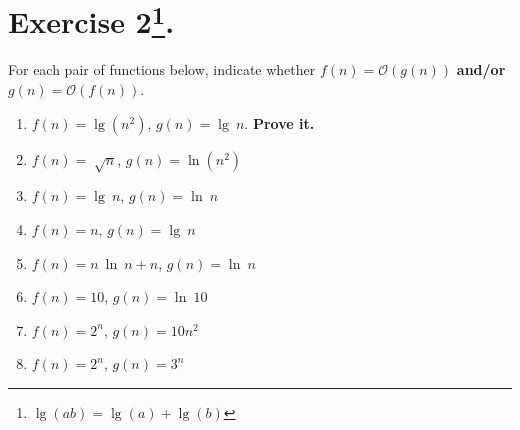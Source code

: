 \documentclass{article}
\begin{document}
\section*{Exercise 2\footnote{$\lg(ab) = \lg(a) + \lg(b)$}.}
For each pair of functions below, indicate whether $f(n) = \mathcal{O}(g(n))$ \textbf{and/or} $g(n) = \mathcal{O}(f(n))$.
\begin{enumerate}
	\item $f(n) = \lg(n^2)$, $g(n) = \lg\ n$. \textbf{Prove it.}
    \item $f(n) = \sqrt[]{n}$, $g(n) = \ln(n^2)$
    \item $f(n) = \lg\ n$, $g(n) = \ln\ n $
    \item $f(n) = n$, $g(n) = \lg\ n $
    \item $f(n) = n\ \ln\ n + n$, $g(n) = \ln\ n$
    \item $f(n) = 10$, $g(n) = \ln\ 10$
    \item $f(n) = 2^n$, $g(n) = 10n^2$
    \item $f(n) = 2^n$, $g(n) = 3^n$
\end{enumerate}
\end{document}
